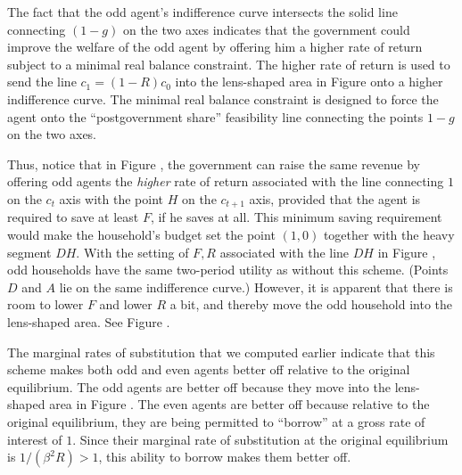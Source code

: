 The fact that the odd agent's indifference curve intersects the solid line
connecting $(1-g)$ on the two axes indicates that the government could improve
the welfare of the odd agent by offering him a higher rate of return subject
to a minimal real balance constraint. The higher rate of return is used to
send the line $c_1 = (1-R) c_0$ into the lens-shaped area in Figure 
onto a higher indifference curve. The minimal real balance constraint is
designed to force the agent onto the ``postgovernment share'' feasibility
line connecting the points $1-g$ on the two axes.

Thus, notice that in Figure , %
 the government can raise the same revenue by
offering odd agents the {\it higher\/} rate of return associated with the line
connecting $1$ on the $c_t$ axis with the point $H$ on the $c_{t+1}$ axis, provided
that the agent is required to save at least $F$, if he saves at all.  This minimum
saving requirement would make the household's budget set the point $(1,0)$  together
with the heavy segment $DH$.  With the setting of $F,R$ associated with the line $DH$
in Figure , %
odd households have the same two-period utility as without this
scheme. (Points $D$ and $A$ lie on the same indifference curve.)  However, it is
apparent that there is room to lower $F$ and lower $R$ a bit, and thereby move the
odd household into the lens-shaped area.  See Figure . %

The marginal rates of substitution that we computed earlier indicate that
this scheme makes both odd and even agents better off relative to the
original equilibrium. The odd agents are better off because they move
into the lens-shaped area in Figure .  The even agents are better
off because relative to the original equilibrium, they are being
permitted to ``borrow'' at a gross rate of interest of $1$.  Since their
marginal rate of substitution at the original equilibrium is
$1/(\beta^2 R) > 1$, this ability to borrow makes them better off.


